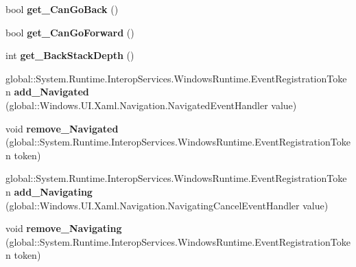 \begin{DoxyCompactItemize}
\item 
\mbox{\label{interface_windows_1_1_u_i_1_1_xaml_1_1_controls_1_1_i_frame_a31e423bda3f37c6c68a64e9a2c3cfc96}} 
bool {\bfseries get\+\_\+\+Can\+Go\+Back} ()
\item 
\mbox{\label{interface_windows_1_1_u_i_1_1_xaml_1_1_controls_1_1_i_frame_a346c7bc9a558e30d8c23493675ea1f25}} 
bool {\bfseries get\+\_\+\+Can\+Go\+Forward} ()
\item 
\mbox{\label{interface_windows_1_1_u_i_1_1_xaml_1_1_controls_1_1_i_frame_ac4b8a2575628ea785683c53acd9f9404}} 
int {\bfseries get\+\_\+\+Back\+Stack\+Depth} ()
\item 
\mbox{\label{interface_windows_1_1_u_i_1_1_xaml_1_1_controls_1_1_i_frame_a624be18e7822eb17b5b16a420e0721bc}} 
global\+::\+System.\+Runtime.\+Interop\+Services.\+Windows\+Runtime.\+Event\+Registration\+Token {\bfseries add\+\_\+\+Navigated} (global\+::\+Windows.\+U\+I.\+Xaml.\+Navigation.\+Navigated\+Event\+Handler value)
\item 
\mbox{\label{interface_windows_1_1_u_i_1_1_xaml_1_1_controls_1_1_i_frame_ae1e509398fa988a1ac20830119b65746}} 
void {\bfseries remove\+\_\+\+Navigated} (global\+::\+System.\+Runtime.\+Interop\+Services.\+Windows\+Runtime.\+Event\+Registration\+Token token)
\item 
\mbox{\label{interface_windows_1_1_u_i_1_1_xaml_1_1_controls_1_1_i_frame_a0fec4101c1beb2f3dca164279586bed6}} 
global\+::\+System.\+Runtime.\+Interop\+Services.\+Windows\+Runtime.\+Event\+Registration\+Token {\bfseries add\+\_\+\+Navigating} (global\+::\+Windows.\+U\+I.\+Xaml.\+Navigation.\+Navigating\+Cancel\+Event\+Handler value)
\item 
\mbox{\label{interface_windows_1_1_u_i_1_1_xaml_1_1_controls_1_1_i_frame_a02c229c53c3cb4701d53b253bce7a3e1}} 
void {\bfseries remove\+\_\+\+Navigating} (global\+::\+System.\+Runtime.\+Interop\+Services.\+Windows\+Runtime.\+Event\+Registration\+Token token)

\end{DoxyCompactItemize}
